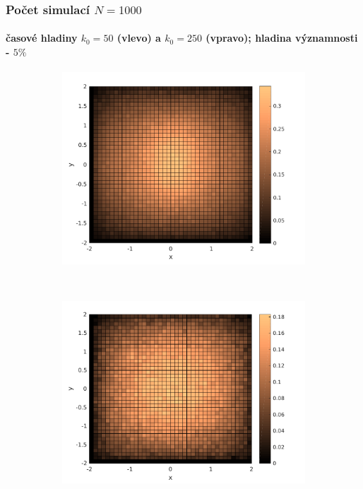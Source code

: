 \begin{frame}\frametitle{Počet simulací $N=1000$}
\framesubtitle{časové hladiny $k_{0}=50$ (vlevo) a $k_{0}=250$ (vpravo); hladina významnosti - $5 \%$}
\begin{figure}
    \centering
    \begin{subfigure}[t]{0.5\textwidth}
        \centering
        \includegraphics[width=1\linewidth]{../../results/simulations/1000/solutionErr/solutionError_sim1000_step01_time50_boundary2.pdf}
    \end{subfigure}%
    ~ 
    \begin{subfigure}[t]{0.5\textwidth}
        \centering
        \includegraphics[width=1.05\linewidth]{../../results/simulations/1000/solutionErr/solutionError_sim1000_step01_time250_boundary2.pdf}
    \end{subfigure}
\end{figure}
\end{frame}


